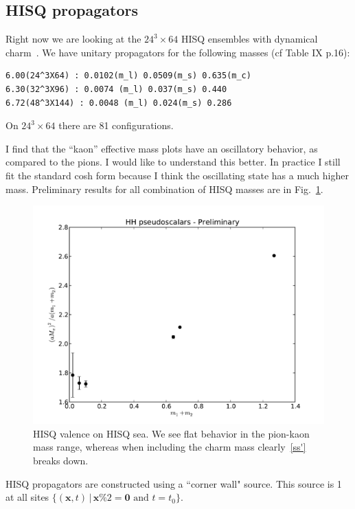 \documentclass[11pt,a4paper]{article}
\newcommand{\ROOT}[0]{/Users/atlytle/Dropbox/Tex_docs}
\begin{document}
\subsection{HISQ propagators}
Right now we are looking at the $24^3 \times 64$ HISQ ensembles with dynamical charm~\cite{Bazavov:2012xda}.
We have unitary propagators for the following masses (cf  Table IX p.16):
\begin{verbatim}
6.00(24^3X64) : 0.0102(m_l) 0.0509(m_s) 0.635(m_c)
6.30(32^3X96) : 0.0074 (m_l) 0.037(m_s) 0.440
6.72(48^3X144) : 0.0048 (m_l) 0.024(m_s) 0.286
\end{verbatim}
On $24^3 \times 64$ there are 81 configurations.

I find that the ``kaon'' effective mass plots have an oscillatory behavior, as compared to 
the pions.  
I would like to understand this better.
In practice I still fit the standard cosh form because I think the oscillating state has a much higher mass. Preliminary results for all combination of HISQ masses are in Fig.~\ref{HH_pseudo}.%
\begin{figure}[h]
\centering
\includegraphics[width=\textwidth]{HH_pseudo}
\caption{HISQ valence on HISQ sea.  We see flat behavior in the pion-kaon mass range, whereas
when including the charm mass clearly~\ref{ss'} breaks down.}
\label{HH_pseudo}
\end{figure}

HISQ propagators are constructed using a ``corner wall" source.  This source is 1 at all sites
$\{ (\mathbf{x}, t) \, | \, \mathbf{x} \% 2 = \mathbf{0} \text{ and } t = t_0\}$.




\end{document}
